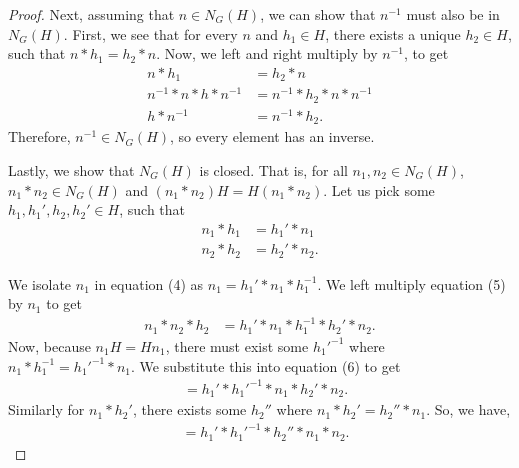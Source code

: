 \documentclass{article}
\begin{document}
\begin{enumerate}
{{\begin{enumerate}
{\begin{proof}
                        Next, assuming that \(n \in N_G(H)\), we can show that 
                        \(n^{-1}\) must also be in \(N_G(H)\).  First, we see that 
                        for every \(n\) and \(h_1 \in H\), there exists a unique 
                        \(h_2 \in H\), such that \(n * h_1 = h_2 * n\). Now, we 
                        left and right multiply by \(n^{-1}\), to get 
                        \begin{align}
                            n * h_1 &= h_2 * n \\
                            n^{-1} * n * h * n^{-1} &= n^{-1} * h_2 * n * n^{-1} \\
                            h * n^{-1} &= n^{-1} * h_2.
                        \end{align}
                        Therefore, \(n^{-1} \in N_G(H)\), so every element has an 
                        inverse.

                        Lastly, we show that \(N_G(H)\) is closed. That is, 
                        for all \(n_1, n_2 \in N_G(H)\), \(n_1 * n_2 \in N_G(H)\) 
                        and \((n_1 * n_2)H = H(n_1 * n_2)\).
                        Let us pick some \(h_1, h_1', h_2, h_2' \in H\), such that 
                        \begin{align}
                            n_1 * h_1 &= h_1' * n_1 \\
                            n_2 * h_2 &= h_2' * n_2.
                        \end{align}

                        We isolate \(n_1\)  in equation (4) as \(n_1 = h_1' * n _1 * h_1^{-1}\).
                        We left multiply equation (5) by \(n_1\) to get
                        \begin{align}
                            n_1 * n_2 * h_2 &= h_1' * n _1 * h_1^{-1} * h_2' * n_2.
                        \end{align}
                        Now, because \(n_1 H = H n_1\), there must exist some 
                        \(h_1'^{-1}\) where \(n_1 * h_1^{-1} = h_1'^{-1} * n_1\).
                        We substitute this into equation (6) to get 
                        \begin{align}
                            &= h_1' * h_1'^{-1} * n_1 * h_2' * n_2.
                        \end{align}
                        Similarly for \(n_1 * h_2'\), there exists some \(h_2''\) 
                        where \(n_1 * h_2' = h_2'' * n_1\). So, we have,
                        \begin{align}
                            &= h_1' * h_1'^{-1} * h_2'' * n_1 * n_2.
                        \end{align}


\end{proof}}
\end{enumerate}}}
\end{enumerate}
\end{document}
